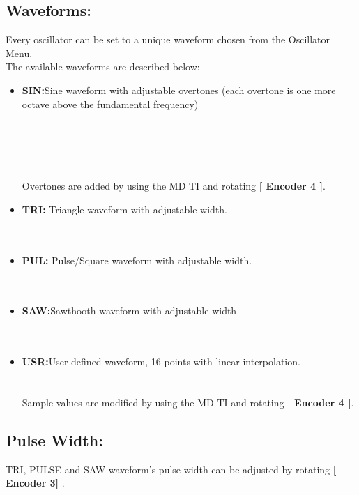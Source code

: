 \subsection{Waveforms:}
Every oscillator can be set to a unique waveform chosen from the Oscillator Menu.
\\
The available waveforms are described below:

\begin{itemize}
\item{\textbf{SIN:}}Sine waveform with adjustable overtones (each overtone is one more octave above the fundamental frequency)\\
\\\\
\\\\
\\Overtones are added by using the MD TI and rotating \textbf{[ Encoder 4 ]}.
\item{\textbf{TRI:}} Triangle waveform with adjustable width.\\
\\\\
\item{\textbf{PUL:}} Pulse/Square waveform with adjustable width.\\
\\\\
\item{\textbf{SAW:}}Sawthooth waveform with adjustable width\\
\\\\
\item{\textbf{USR:}}User defined waveform, 16 points with linear interpolation.\\
\\\\
Sample values are modified by using the MD TI and rotating \textbf{[ Encoder 4 ]}.
\end{itemize}
\subsection{Pulse Width:}
TRI, PULSE and SAW waveform's pulse width can be adjusted by rotating \textbf{[ Encoder 3] }.\\
\\
\newpage
